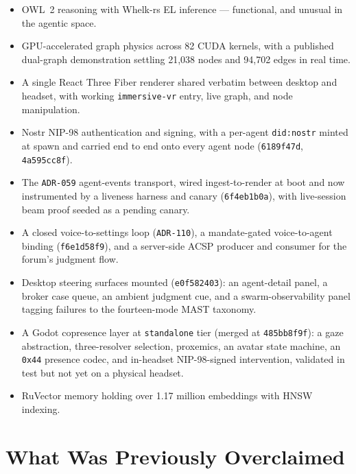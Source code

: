 \begin{itemize}
  \item OWL~2 reasoning with Whelk-rs EL inference --- functional, and unusual in the agentic space.
  \item GPU-accelerated graph physics across 82 CUDA kernels, with a published dual-graph demonstration settling 21,038 nodes and 94,702 edges in real time.
  \item A single React Three Fiber renderer shared verbatim between desktop and headset, with working \texttt{immersive-vr} entry, live graph, and node manipulation.
  \item Nostr NIP-98 authentication and signing, with a per-agent \texttt{did:nostr} minted at spawn and carried end to end onto every agent node (\texttt{6189f47d}, \texttt{4a595cc8f}).
  \item The \texttt{ADR-059} agent-events transport, wired ingest-to-render at boot and now instrumented by a liveness harness and canary (\texttt{6f4eb1b0a}), with live-session beam proof seeded as a pending canary.
  \item A closed voice-to-settings loop (\texttt{ADR-110}), a mandate-gated voice-to-agent binding (\texttt{f6e1d58f9}), and a server-side ACSP producer and consumer for the forum's judgment flow.
  \item Desktop steering surfaces mounted (\texttt{e0f582403}): an agent-detail panel, a broker case queue, an ambient judgment cue, and a swarm-observability panel tagging failures to the fourteen-mode MAST taxonomy.
  \item A Godot copresence layer at \texttt{standalone} tier (merged at \texttt{485bb8f9f}): a gaze abstraction, three-resolver selection, proxemics, an avatar state machine, an \texttt{0x44} presence codec, and in-headset NIP-98-signed intervention, validated in test but not yet on a physical headset.
  \item RuVector memory holding over 1.17 million embeddings with HNSW indexing.
\end{itemize}

\section{What Was Previously Overclaimed}

